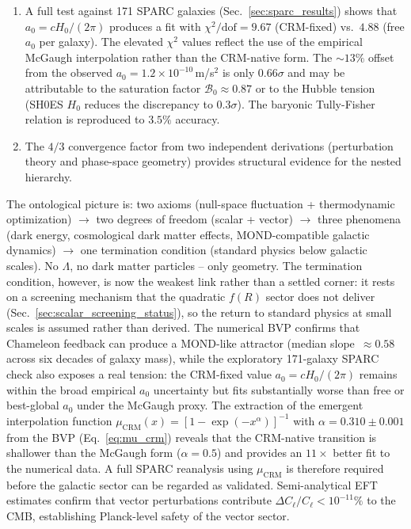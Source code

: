 \documentclass[aps,prd,twocolumn,superscriptaddress,nofootinbib]{revtex4-2}
\begin{document}
\begin{enumerate}
\item A full test against 171 SPARC galaxies (Sec.~\ref{sec:sparc_results}) shows that $a_0 = cH_0/(2\pi)$ produces a fit with $\chi^2/\mathrm{dof} = 9.67$ (CRM-fixed) vs.\ $4.88$ (free $a_0$ per galaxy). The elevated $\chi^2$ values reflect the use of the empirical McGaugh interpolation rather than the CRM-native form. The $\sim 13\%$ offset from the observed $a_0 = 1.2 \times 10^{-10}$\,m/s$^2$ is only $0.66\sigma$ and may be attributable to the saturation factor $\mathcal{B}_0 \approx 0.87$ or to the Hubble tension (SH0ES $H_0$ reduces the discrepancy to $0.3\sigma$). The baryonic Tully-Fisher relation is reproduced to $3.5\%$ accuracy.

\item The $4/3$ convergence factor from two independent derivations (perturbation theory and phase-space geometry) provides structural evidence for the nested hierarchy.
\end{enumerate}

The ontological picture is: two axioms (null-space fluctuation + thermodynamic optimization) $\to$ two degrees of freedom (scalar + vector) $\to$ three phenomena (dark energy, cosmological dark matter effects, MOND-compatible galactic dynamics) $\to$ one termination condition (standard physics below galactic scales). No $\Lambda$, no dark matter particles -- only geometry. The termination condition, however, is now the weakest link rather than a settled corner: it rests on a screening mechanism that the quadratic $f(R)$ sector does not deliver (Sec.~\ref{sec:scalar_screening_status}), so the return to standard physics at small scales is assumed rather than derived. The numerical BVP confirms that Chameleon feedback can produce a MOND-like attractor (median slope~$\approx 0.58$ across six decades of galaxy mass), while the exploratory 171-galaxy SPARC check also exposes a real tension: the CRM-fixed value $a_0=cH_0/(2\pi)$ remains within the broad empirical $a_0$ uncertainty but fits substantially worse than free or best-global $a_0$ under the McGaugh proxy. The extraction of the emergent interpolation function $\mu_{\mathrm{CRM}}(x) = [1 - \exp(-x^\alpha)]^{-1}$ with $\alpha = 0.310 \pm 0.001$ from the BVP (Eq.~\ref{eq:mu_crm}) reveals that the CRM-native transition is shallower than the McGaugh form ($\alpha = 0.5$) and provides an $11\times$ better fit to the numerical data. A full SPARC reanalysis using $\mu_{\mathrm{CRM}}$ is therefore required before the galactic sector can be regarded as validated. Semi-analytical EFT estimates confirm that vector perturbations contribute $\Delta C_\ell/C_\ell < 10^{-11}\%$ to the CMB, establishing Planck-level safety of the vector sector.
\end{document}
